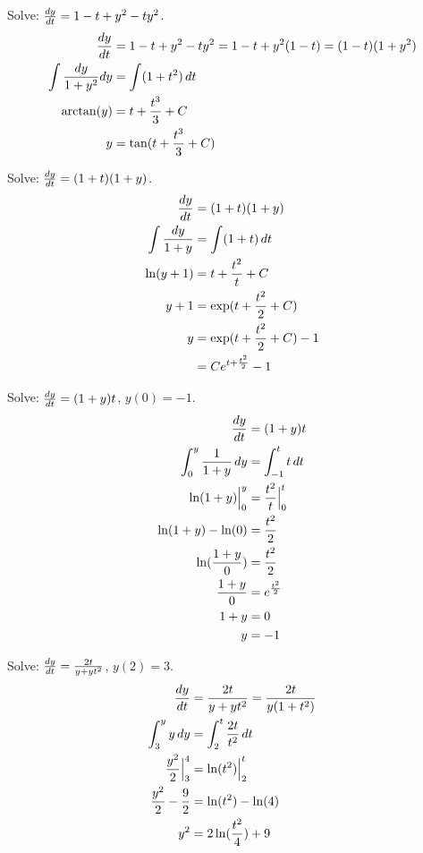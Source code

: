 \documentclass[12pt]{article}
\begin{document}
\begin{example} Solve: $\frac{dy}{dt} = 1 - t + y^2 - ty^2$. $$ \begin{aligned} 
\frac{dy}{dt} &= 1 - t + y^2 - ty^2 = 1 - t + y^2(1 - t) = (1 - t)(1 + y^2) \\ \int \frac{dy}{1 + y^2}dy &= \int (1 + t^2) \, dt \\ 
\arctan(y) &= t + \frac{t^3}{3} + C \\ y &= \tan(t + \frac{t^3}{3} + C) \end{aligned} $$ \end{example} 
\begin{example} Solve: $\frac{dy}{dt} = (1 + t)(1 + y)$. $$ \begin{aligned}
\frac{dy}{dt} &= (1 + t)(1 + y) \\ \int \frac{dy}{1 + y} &= \int (1 + t) \, dt \\ \ln(y + 1) &= t + \frac{t^2}{t} + C \\ y + 1 &= \exp(t + \frac{t^2}{2} + C) \\ y &= \exp(t + \frac{t^2}{2} + C) - 1 \\ &= Ce^{t + \frac{t^2}{2}} - 1 \end{aligned} $$ \end{example} 
\begin{example} Solve: $\frac{dy}{dt} = (1 + y)t$, $y(0) = -1$. $$ \begin{aligned} 
\frac{dy}{dt} &= (1 + y)t \\ \int_0^y \frac{1}{1 + y} \, dy &= \int_{-1}^t t \, dt \\ \ln(1 + y)\Big|_0^y &= \frac{t^2}{t}\Big|_0^t \\ \ln(1 + y) - \ln(0) &= \frac{t^2}{2} \\ \ln(\frac{1 + y}{0}) &= \frac{t^2}{2} \\ \frac{1 + y}{0} &= e^{\frac{t^2}{2}} \\ 
1 + y &= 0 \\ y &= -1 \end{aligned} $$ \end{example} 
\begin{example} Solve: $\frac{dy}{dt} = \frac{2t}{y + yt^2}$, $y(2) = 3$. $$ \begin{aligned} 
\frac{dy}{dt} &= \frac{2t}{y + yt^2} = \frac{2t}{y(1 + t^2)} \\ \int_3^y y \, dy &= \int_2^t \frac{2t}{t^2} \, dt \\ \frac{y^2}{2}\Big|_3^4 &= \ln(t^2)\Big|_2^t \\ \frac{y^2}{2} - \frac{9}{2} &= \ln(t^2) - \ln(4) \\ y^2 &= 2\ln(\frac{t^2}{4}) + 9 \end{aligned} $$ \end{example} 
\end{document}
